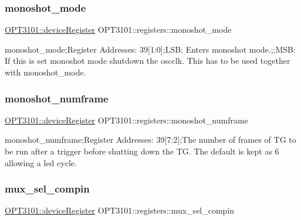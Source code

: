 \mbox{\label{class_o_p_t3101_1_1registers_adb2df2fa5f4a83807458958db5ee71eb}} 
\subsubsection{\texorpdfstring{monoshot\+\_\+mode}{monoshot\_mode}}
{\footnotesize\ttfamily \mbox{\hyperlink{class_o_p_t3101_1_1device_register}{O\+P\+T3101\+::device\+Register}} O\+P\+T3101\+::registers\+::monoshot\+\_\+mode}



monoshot\+\_\+mode;Register Addresses\+: 39\mbox{[}1\+:0\mbox{]};L\+SB\+: Enters monoshot mode.;;M\+SB\+: If this is set monoshot mode shutdown the oscclk. This has to be used together with monoshot\+\_\+mode. 

\mbox{\label{class_o_p_t3101_1_1registers_a88eb0b748ad9049d7c563196e7518f43}} 
\subsubsection{\texorpdfstring{monoshot\+\_\+numframe}{monoshot\_numframe}}
{\footnotesize\ttfamily \mbox{\hyperlink{class_o_p_t3101_1_1device_register}{O\+P\+T3101\+::device\+Register}} O\+P\+T3101\+::registers\+::monoshot\+\_\+numframe}



monoshot\+\_\+numframe;Register Addresses\+: 39\mbox{[}7\+:2\mbox{]};The number of frames of TG to be run after a trigger before shutting down the TG. The default is kept as 6 allowing a led cycle. 

\mbox{\label{class_o_p_t3101_1_1registers_aaaa862ca09860e4a8cec1095a9fa0b01}} 
\subsubsection{\texorpdfstring{mux\+\_\+sel\+\_\+compin}{mux\_sel\_compin}}
{\footnotesize\ttfamily \mbox{\hyperlink{class_o_p_t3101_1_1device_register}{O\+P\+T3101\+::device\+Register}} O\+P\+T3101\+::registers\+::mux\+\_\+sel\+\_\+compin}



